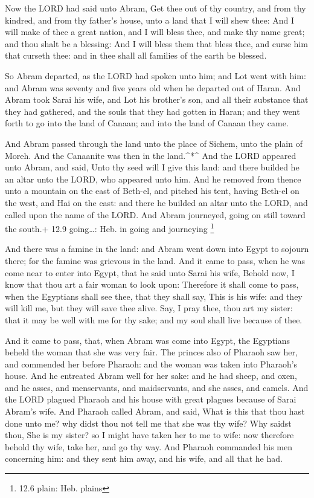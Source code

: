  Now the LORD had said unto Abram, Get thee out of thy
country, and from thy kindred, and from thy father's house, unto a land
that I will shew thee:  And I will make of thee a great
nation, and I will bless thee, and make thy name great; and thou shalt
be a blessing:  And I will bless them that bless thee, and
curse him that curseth thee: and in thee shall all families of the earth
be blessed.

 So Abram departed, as the LORD had spoken unto him; and Lot
went with him: and Abram was seventy and five years old when he departed
out of Haran.  And Abram took Sarai his wife, and Lot his
brother's son, and all their substance that they had gathered, and the
souls that they had gotten in Haran; and they went forth to go into the
land of Canaan; and into the land of Canaan they came.

 And Abram passed through the land unto the place of Sichem,
unto the plain of Moreh. And the Canaanite was then in the
land.\^{}*\^{}  And the LORD appeared unto Abram, and said,
Unto thy seed will I give this land: and there builded he an altar unto
the LORD, who appeared unto him.  And he removed from thence
unto a mountain on the east of Beth-el, and pitched his tent, having
Beth-el on the west, and Hai on the east: and there he builded an altar
unto the LORD, and called upon the name of the LORD.  And
Abram journeyed, going on still toward the south.+ 12.9 going\ldots:
Heb. in going and journeying \footnote{12.6 plain: Heb. plains}

 And there was a famine in the land: and Abram went down
into Egypt to sojourn there; for the famine was grievous in the land.
 And it came to pass, when he was come near to enter into
Egypt, that he said unto Sarai his wife, Behold now, I know that thou
art a fair woman to look upon:  Therefore it shall come to
pass, when the Egyptians shall see thee, that they shall say, This is
his wife: and they will kill me, but they will save thee alive.
 Say, I pray thee, thou art my sister: that it may be well
with me for thy sake; and my soul shall live because of thee.

 And it came to pass, that, when Abram was come into Egypt,
the Egyptians beheld the woman that she was very fair.  The
princes also of Pharaoh saw her, and commended her before Pharaoh: and
the woman was taken into Pharaoh's house.  And he entreated
Abram well for her sake: and he had sheep, and oxen, and he asses, and
menservants, and maidservants, and she asses, and camels. 
And the LORD plagued Pharaoh and his house with great plagues because of
Sarai Abram's wife.  And Pharaoh called Abram, and said,
What is this that thou hast done unto me? why didst thou not tell me
that she was thy wife?  Why saidst thou, She is my sister?
so I might have taken her to me to wife: now therefore behold thy wife,
take her, and go thy way.  And Pharaoh commanded his men
concerning him: and they sent him away, and his wife, and all that he
had.

